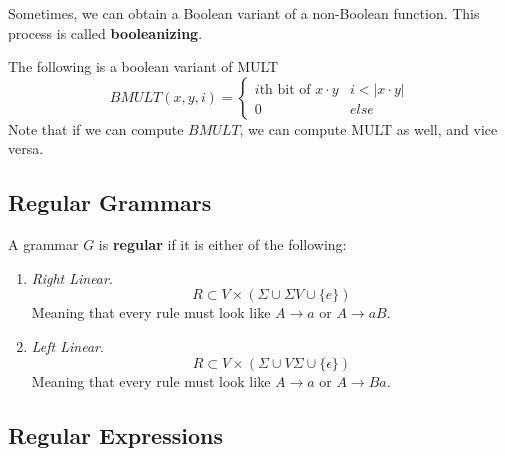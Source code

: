   \begin{definition}
    \label{def:booleanizing-a-function}
    Sometimes, we can obtain a Boolean variant of a non-Boolean function. This process is called \textbf{booleanizing}. 
  \end{definition}

  \begin{example}
    \label{ex:boolean-variant-of-mult}
    The following is a boolean variant of MULT
    \begin{equation}
      BMULT(x, y, i) = \begin{cases}
          i\text{th bit of } x\cdot y & i < |x \cdot y|\\
          0 & else
          \end{cases}
    \end{equation}
    Note that if we can compute $BMULT$, we can compute MULT as well, and vice versa. 
  \end{example}

\subsection{Regular Grammars} 

  \begin{definition}
    \label{def:regular-grammar}
    A grammar $G$ is \textbf{regular} if it is either of the following: 
    \begin{enumerate}
      \item \textit{Right Linear}. 
        \begin{equation}
          R \subset V \times (\Sigma \cup \Sigma V \cup \{e\}) 
        \end{equation}
        Meaning that every rule must look like $A \to a$ or $A \to a B$. 

      \item \textit{Left Linear}. 
        \begin{equation}
          R \subset V \times (\Sigma \cup V \Sigma \cup \{\epsilon\}) 
        \end{equation}
        Meaning that every rule must look like $A \to a$ or $A \to Ba$. 
    \end{enumerate}
  \end{definition}

\subsection{Regular Expressions}

